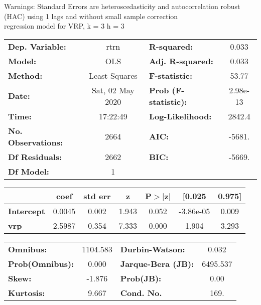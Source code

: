 Warnings: \newline
 [1] Standard Errors are heteroscedasticity and autocorrelation robust (HAC) using 1 lags and without small sample correction\\ 

regression model for VRP, k = 3 h = 3\begin{center}
\begin{tabular}{lclc}
\toprule
\textbf{Dep. Variable:}    &       rtrn       & \textbf{  R-squared:         } &     0.033   \\
\textbf{Model:}            &       OLS        & \textbf{  Adj. R-squared:    } &     0.033   \\
\textbf{Method:}           &  Least Squares   & \textbf{  F-statistic:       } &     53.77   \\
\textbf{Date:}             & Sat, 02 May 2020 & \textbf{  Prob (F-statistic):} &  2.98e-13   \\
\textbf{Time:}             &     17:22:49     & \textbf{  Log-Likelihood:    } &    2842.4   \\
\textbf{No. Observations:} &        2664      & \textbf{  AIC:               } &    -5681.   \\
\textbf{Df Residuals:}     &        2662      & \textbf{  BIC:               } &    -5669.   \\
\textbf{Df Model:}         &           1      & \textbf{                     } &             \\
\bottomrule
\end{tabular}
\begin{tabular}{lcccccc}
                   & \textbf{coef} & \textbf{std err} & \textbf{z} & \textbf{P$> |$z$|$} & \textbf{[0.025} & \textbf{0.975]}  \\
\midrule
\textbf{Intercept} &       0.0045  &        0.002     &     1.943  &         0.052        &    -3.86e-05    &        0.009     \\
\textbf{vrp}       &       2.5987  &        0.354     &     7.333  &         0.000        &        1.904    &        3.293     \\
\bottomrule
\end{tabular}
\begin{tabular}{lclc}
\textbf{Omnibus:}       & 1104.583 & \textbf{  Durbin-Watson:     } &    0.032  \\
\textbf{Prob(Omnibus):} &   0.000  & \textbf{  Jarque-Bera (JB):  } & 6495.537  \\
\textbf{Skew:}          &  -1.876  & \textbf{  Prob(JB):          } &     0.00  \\
\textbf{Kurtosis:}      &   9.667  & \textbf{  Cond. No.          } &     169.  \\
\bottomrule
\end{tabular}
\end{center}

